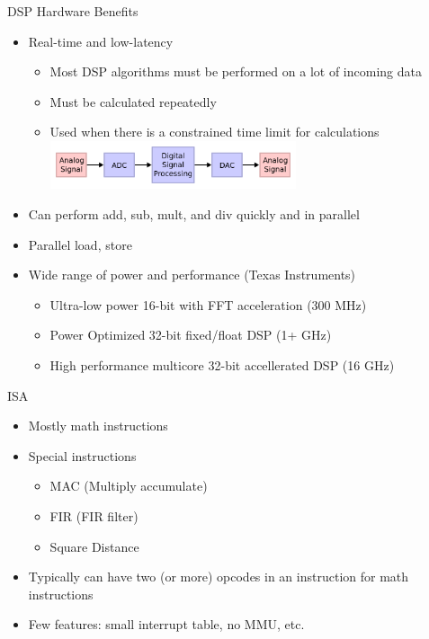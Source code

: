 \documentclass{beamer}
\begin{document}
\begin{frame}{DSP Hardware Benefits}
    \begin{itemize}
        \item Real-time and low-latency
            \begin{itemize}
                \item Most DSP algorithms must be performed on a lot of incoming data
                \item Must be calculated repeatedly
                \item Used when there is a constrained time limit for calculations
                    \includegraphics[width=0.6\textwidth]{block_diagram.png}
            \end{itemize}
        \item Can perform add, sub, mult, and div quickly and in parallel
        \item Parallel load, store
        \item Wide range of power and performance (Texas Instruments)
            \begin{itemize}
                \item Ultra-low power 16-bit with FFT acceleration (300 MHz)
                \item Power Optimized 32-bit fixed/float DSP (1+ GHz)
                \item High performance multicore 32-bit accellerated DSP (16 GHz)
            \end{itemize}
    \end{itemize}
\end{frame}

\begin{frame}{ISA}
    \begin{itemize}
        \item Mostly math instructions
        \item Special instructions
            \begin{itemize}
                \item MAC (Multiply accumulate)
                \item FIR (FIR filter)
                \item Square Distance
            \end{itemize}
        \item Typically can have two (or more) opcodes in an instruction for
            math instructions
        \item Few features: small interrupt table, no MMU, etc.
    \end{itemize}
\end{frame}
\end{document}
